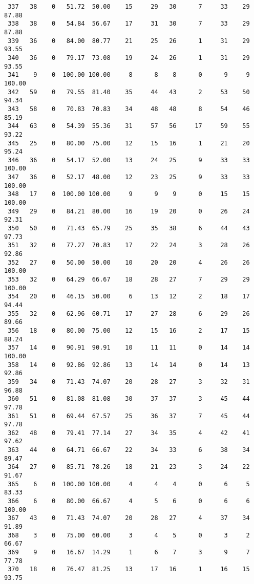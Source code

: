 \begin{verbatim}
 337   38    0   51.72  50.00    15     29   30      7     33    29    87.88
 338   38    0   54.84  56.67    17     31   30      7     33    29    87.88
 339   36    0   84.00  80.77    21     25   26      1     31    29    93.55
 340   36    0   79.17  73.08    19     24   26      1     31    29    93.55
 341    9    0  100.00 100.00     8      8    8      0      9     9   100.00
 342   59    0   79.55  81.40    35     44   43      2     53    50    94.34
 343   58    0   70.83  70.83    34     48   48      8     54    46    85.19
 344   63    0   54.39  55.36    31     57   56     17     59    55    93.22
 345   25    0   80.00  75.00    12     15   16      1     21    20    95.24
 346   36    0   54.17  52.00    13     24   25      9     33    33   100.00
 347   36    0   52.17  48.00    12     23   25      9     33    33   100.00
 348   17    0  100.00 100.00     9      9    9      0     15    15   100.00
 349   29    0   84.21  80.00    16     19   20      0     26    24    92.31
 350   50    0   71.43  65.79    25     35   38      6     44    43    97.73
 351   32    0   77.27  70.83    17     22   24      3     28    26    92.86
 352   27    0   50.00  50.00    10     20   20      4     26    26   100.00
 353   32    0   64.29  66.67    18     28   27      7     29    29   100.00
 354   20    0   46.15  50.00     6     13   12      2     18    17    94.44
 355   32    0   62.96  60.71    17     27   28      6     29    26    89.66
 356   18    0   80.00  75.00    12     15   16      2     17    15    88.24
 357   14    0   90.91  90.91    10     11   11      0     14    14   100.00
 358   14    0   92.86  92.86    13     14   14      0     14    13    92.86
 359   34    0   71.43  74.07    20     28   27      3     32    31    96.88
 360   51    0   81.08  81.08    30     37   37      3     45    44    97.78
 361   51    0   69.44  67.57    25     36   37      7     45    44    97.78
 362   48    0   79.41  77.14    27     34   35      4     42    41    97.62
 363   44    0   64.71  66.67    22     34   33      6     38    34    89.47
 364   27    0   85.71  78.26    18     21   23      3     24    22    91.67
 365    6    0  100.00 100.00     4      4    4      0      6     5    83.33
 366    6    0   80.00  66.67     4      5    6      0      6     6   100.00
 367   43    0   71.43  74.07    20     28   27      4     37    34    91.89
 368    3    0   75.00  60.00     3      4    5      0      3     2    66.67
 369    9    0   16.67  14.29     1      6    7      3      9     7    77.78
 370   18    0   76.47  81.25    13     17   16      1     16    15    93.75

\end{verbatim}
